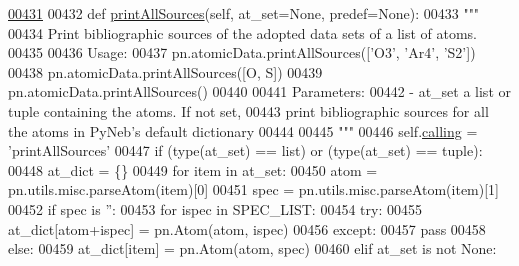 \begin{DoxyCode}
\hypertarget{classpyneb_1_1utils_1_1manage__atomic__data_1_1___manage_atomic_data_l00431}{}\hyperlink{classpyneb_1_1utils_1_1manage__atomic__data_1_1___manage_atomic_data_a17f7d0a39484aa363bd2814ffbee2855}{00431} 
00432     \textcolor{keyword}{def }\hyperlink{classpyneb_1_1utils_1_1manage__atomic__data_1_1___manage_atomic_data_a17f7d0a39484aa363bd2814ffbee2855}{printAllSources}(self, at\_set=None, predef=None):
00433         \textcolor{stringliteral}{"""}
00434 \textcolor{stringliteral}{        Print bibliographic sources of the adopted data sets of a list of atoms.}
00435 \textcolor{stringliteral}{        }
00436 \textcolor{stringliteral}{        Usage:}
00437 \textcolor{stringliteral}{        pn.atomicData.printAllSources(['O3', 'Ar4', 'S2'])}
00438 \textcolor{stringliteral}{        pn.atomicData.printAllSources([O, S])}
00439 \textcolor{stringliteral}{        pn.atomicData.printAllSources()}
00440 \textcolor{stringliteral}{}
00441 \textcolor{stringliteral}{        Parameters: }
00442 \textcolor{stringliteral}{            - at\_set   a list or tuple containing the atoms. If not set, }
00443 \textcolor{stringliteral}{                       print bibliographic sources for all the atoms in PyNeb's default dictionary}
00444 \textcolor{stringliteral}{                       }
00445 \textcolor{stringliteral}{        """}        
00446         self.\hyperlink{classpyneb_1_1utils_1_1manage__atomic__data_1_1___manage_atomic_data_ab10b91ca784741ce7af163d010802434}{calling} = \textcolor{stringliteral}{'printAllSources'}
00447         \textcolor{keywordflow}{if} (type(at\_set) == list) \textcolor{keywordflow}{or} (type(at\_set) == tuple):
00448             at\_dict = \{\}
00449             \textcolor{keywordflow}{for} item \textcolor{keywordflow}{in} at\_set:
00450                 atom = pn.utils.misc.parseAtom(item)[0]
00451                 spec = pn.utils.misc.parseAtom(item)[1]
00452                 \textcolor{keywordflow}{if} spec \textcolor{keywordflow}{is} \textcolor{stringliteral}{''}:
00453                     \textcolor{keywordflow}{for} ispec \textcolor{keywordflow}{in} SPEC\_LIST:
00454                         \textcolor{keywordflow}{try}:
00455                             at\_dict[atom+ispec] = pn.Atom(atom, ispec)
00456                         \textcolor{keywordflow}{except}:
00457                             \textcolor{keywordflow}{pass}
00458                 \textcolor{keywordflow}{else}:
00459                     at\_dict[item] = pn.Atom(atom, spec)
00460         \textcolor{keywordflow}{elif} at\_set \textcolor{keywordflow}{is} \textcolor{keywordflow}{not} \textcolor{keywordtype}{None}:

\end{DoxyCode}
